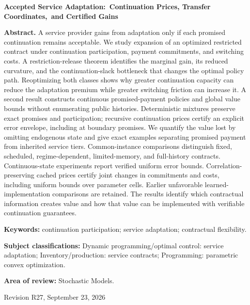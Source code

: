 \documentclass[11pt,letterpaper]{article}
\theoremstyle{definition}\newtheorem{assumption}[theorem]{Assumption}
\begin{document}
\begin{titlepage}\centering
{\Large\bfseries Accepted Service Adaptation:\ Continuation Prices, Transfer Coordinates,\ and Certified Gains\par}
\vspace{.35in}{Anonymous manuscript for Operations Research\par}\vspace{.25in}
\begin{minipage}{\textwidth}
\textbf{Abstract.}
A service provider gains from adaptation only if each promised continuation remains acceptable. We study expansion of an optimized restricted contract under continuation participation, payment commitments, and switching costs. A restriction-release theorem identifies the marginal gain, its reduced curvature, and the continuation-slack bottleneck that changes the optimal policy path. Reoptimizing both classes shows why greater continuation capacity can reduce the adaptation premium while greater switching friction can increase it. A second result constructs continuous promised-payment policies and global value bounds without enumerating public histories. Deterministic mixtures preserve exact promises and participation; recursive continuation prices certify an explicit error envelope, including at boundary promises. We quantify the value lost by omitting endogenous state and give exact examples separating promised payment from inherited service tiers. Common-instance comparisons distinguish fixed, scheduled, regime-dependent, limited-memory, and full-history contracts. Continuous-state experiments report verified uniform error bounds. Correlation-preserving cached prices certify joint changes in commitments and costs, including uniform bounds over parameter cells. Earlier unfavorable learned-implementation comparisons are retained. The results identify which contractual information creates value and how that value can be implemented with verifiable continuation guarantees.
\par\vspace{.15in}\textbf{Keywords:} continuation participation; service adaptation; contractual flexibility.
\par\vspace{.1in}\textbf{Subject classifications:} Dynamic programming/optimal control: service adaptation; Inventory/production: service contracts; Programming: parametric convex optimization.
\par\vspace{.1in}\textbf{Area of review:} Stochastic Models.
\end{minipage}\vfill{Revision R27, September 23, 2026\par}
\end{titlepage}
\end{document}
